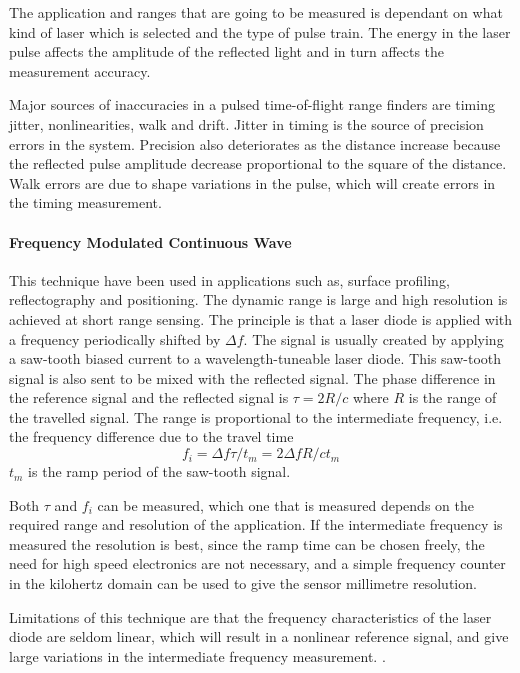 The application and ranges that are going to be measured is dependant on what kind of
laser which is selected and the type of pulse train. The energy in the laser pulse affects the amplitude of the
reflected light and in turn affects the measurement accuracy.

Major sources of inaccuracies in a pulsed time-of-flight range finders are timing jitter,
nonlinearities, walk and drift. Jitter in timing is the source of precision errors in the
system. Precision also deteriorates as the distance increase because the reflected pulse
amplitude decrease proportional to the square of the distance\cite{pulsed-tof}.
Walk errors are due to shape variations in the pulse, which will create errors in the
timing measurement. 





\paragraph{Frequency Modulated Continuous Wave}
This technique have been used in applications such as, surface profiling, 
reflectography and positioning. The dynamic range is large and
high resolution is achieved at short range sensing. The principle is that a laser diode is applied
with a frequency periodically shifted by $\Delta f$. The signal is usually created by 
applying a saw-tooth biased current to a wavelength-tuneable laser diode. This saw-tooth
signal is also sent to be mixed with the reflected signal. The phase difference in the
reference signal and the reflected signal is $\tau = 2 R / c$ where $R$ is the range of
the travelled signal. The range is proportional to the intermediate frequency, i.e. the
frequency difference due to the travel time
\begin{equation}
    f_i = \Delta f \tau /t_m = 2 \Delta f R /c t_m
\end{equation}
$t_m$ is the ramp period of the saw-tooth signal. 

Both $\tau$ and $f_i$ can be measured, which one that is measured depends on the required
range and resolution of the application. If the intermediate frequency is measured the resolution is best,
since the ramp time can be chosen freely, the need for high speed electronics are not
necessary, and a simple frequency counter in the kilohertz domain can be used to give the
sensor millimetre resolution.

Limitations of this technique are that the frequency characteristics of the laser diode
are seldom linear, which will result in a nonlinear reference signal, and give large  
variations in the intermediate frequency measurement.
\cite{laser-ranging-critical-review}.

